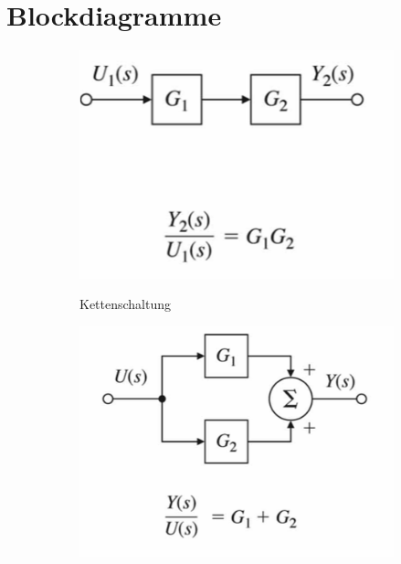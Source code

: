 \section{Blockdiagramme}
\begin{tcolorbox}[colback=white!10!white,colframe=blue!50!black,title=Regeln]
	
	\begin{figure}[H]
		\begin{subfigure}{.3\textwidth}
			\centering
			\includegraphics[width=1\textwidth]{content/img/kettenschaltung}
			\label{fig:kettenschaltung}
			\caption{Kettenschaltung}
		\end{subfigure}%
		\begin{subfigure}{.3\textwidth}
	\centering
	\includegraphics[width=1\textwidth]{content/img/parallel}

\end{subfigure}
\end{figure}
\end{tcolorbox}
